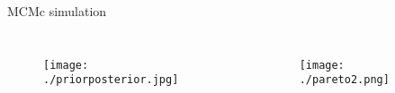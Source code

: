 \documentclass{beamer}
\begin{document}
\begin{frame}{MCMc simulation}
	\begin{columns}
		\begin{figure}
			\centering
			\texttt{[image: ./priorposterior.jpg]}
		\end{figure}
		\begin{figure}
			\centering
			\texttt{[image: ./pareto2.png]}
		\end{figure}
	\end{columns}

\end{frame}
\end{document}
